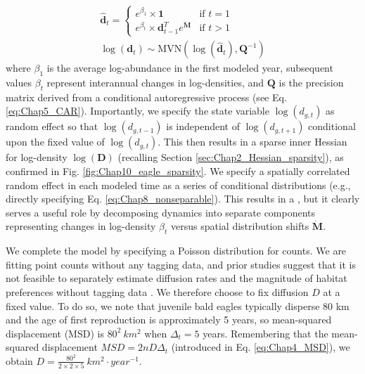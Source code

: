 \begin{equation}
\begin{gathered} \label{eq:Chap10_eagles}
  \hat{\mathbf{d}}_{t} = 
  \begin{cases}
    e^{\beta_1} \times \mathbf{1} & \text{if } t=1  \\ 
    e^{\beta_t} \times \mathbf{d}_{t-1}^T e^{\dot{\mathbf{M}}} & \text{if } t>1   
  \end{cases} \\ 
  \log(\mathbf{d}_{t}) \sim \mathrm{MVN} \left( \log(\hat{\mathbf{d}}_{t}), \mathbf{Q}^{-1} \right) 
\end{gathered}
\end{equation}
where \(\beta_1\) is the average log-abundance in the first modeled year, subsequent values \(\beta_t\) represent interannual changes in log-densities, and \( \mathbf{Q} \) is the precision matrix derived from a conditional autoregressive process (see Eq. \ref{eq:Chap5_CAR}).  Importantly, we specify the state variable \( \log(d_{g,t}) \) as random effect so that \( \log(d_{g,t-1}) \) is independent of \( \log(d_{g,t+1}) \) conditional upon the fixed value of \( \log(d_{g,t}) \).  This then results in a sparse inner Hessian for log-density \( \log(\mathbf{D}) \) (recalling Section \ref{sec:Chap2_Hessian_sparsity}), as confirmed in Fig. \ref{fig:Chap10_eagle_sparsity}.  We specify a spatially correlated random effect in each modeled time as a series of conditional distributions (e.g., directly specifying Eq. \ref{eq:Chap8_nonseparable}).  This results in a , but it clearly serves a useful role by decomposing dynamics into separate components representing changes in log-density \(\beta_t\) versus spatial distribution shifts \(\dot{\mathbf{M}}\).  

We complete the model by specifying a Poisson distribution for counts.  We are fitting point counts without any tagging data, and prior studies suggest that it is not feasible to separately estimate diffusion rates and the magnitude of habitat preferences without tagging data \cite{thorson_estimating_2021}.  We therefore choose to fix diffusion \(D\) at a fixed value.  To do so, we note that juvenile bald eagles typically disperse 80 km and the age of first reproduction is approximately 5 years, so mean-squared displacement (MSD) is \(80^2 \: km^2\) when \(\Delta_t = 5\) years.  Remembering that the mean-squared displacement \(MSD = 2nD\Delta_t\) (introduced in Eq. \ref{eq:Chap4_MSD}), we obtain \(D = \frac{80^2}{2 \times 2 \times 5} \: km^2 \cdot year^{-1}\).  

